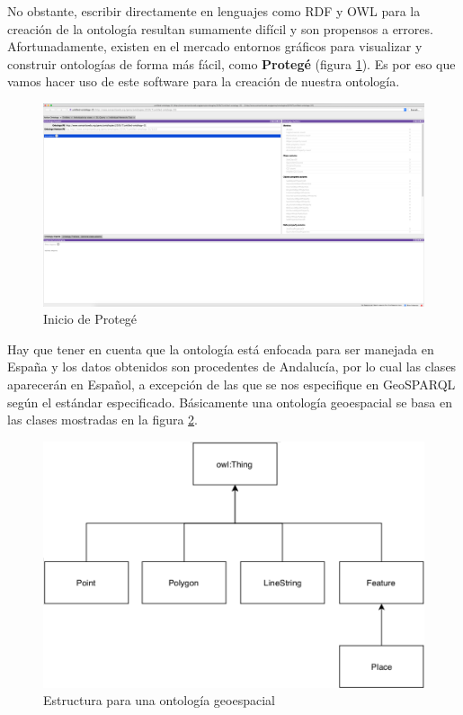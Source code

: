 No obstante, escribir directamente en lenguajes como RDF y OWL para la creación de la ontología resultan sumamente difícil y son propensos a errores. Afortunadamente, existen en el mercado entornos gráficos para visualizar y construir ontologías de forma más fácil, como \textbf{Protegé} (figura \ref{fig:protege}). Es por eso que vamos hacer uso de este software para la creación de nuestra ontología.

\begin{figure}[H]
	\centering
	\includegraphics[width=1\linewidth]{imagenes/capitulo5/protege}
	\caption{Inicio de Protegé}
	\label{fig:protege}
\end{figure}


Hay que tener en cuenta que la ontología está enfocada para ser manejada en España y los datos obtenidos son procedentes de Andalucía, por lo cual las clases aparecerán en Español, a excepción de las que se nos especifique en GeoSPARQL según el estándar especificado. Básicamente una ontología geoespacial se basa en las clases mostradas en la figura \ref{fig:ontologia-geosparql}.

\begin{figure}[H]
	\centering
	\includegraphics[width=0.7\linewidth]{imagenes/capitulo5/ontologia-geosparql}
	\caption{Estructura para una ontología geoespacial}
	\label{fig:ontologia-geosparql}
\end{figure}

